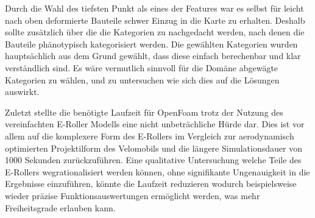 Durch die Wahl des tiefsten Punkt als eines der Features war es selbst für leicht nach oben deformierte Bauteile schwer Einzug in die Karte zu erhalten.
Deshalb sollte zusätzlich über die die Kategorien zu nachgedacht werden, nach denen die Bauteile phänotypisch kategorisiert werden.
Die gewählten Kategorien wurden hauptsächlich aus dem Grund gewählt, dass diese einfach berechenbar und klar verständlich sind.
Es wäre vermutlich sinnvoll für die Domäne abgewägte Kategorien zu wählen, und zu untersuchen wie sich dies auf die Lösungen auswirkt.

Zuletzt stellte die benötigte Laufzeit für OpenFoam trotz der Nutzung des vereinfachten E-Roller Modells eine nicht unbeträchliche Hürde dar.
Dies ist vor allem auf die komplexere Form des E-Rollers im Vergleich zur aerodynamisch optimierten Projektilform des Velomobils und die längere Simulationsdauer von 1000 Sekunden zurückzuführen.
Eine qualitative Untersuchung welche Teile des E-Rollers wegrationalisiert werden können, ohne signifikante Ungenauigkeit in die Ergebnisse einzuführen, könnte die Laufzeit reduzieren wodurch beispielsweise wieder präzise Funktionsauswertungen ermöglicht werden, was mehr Freiheitsgrade erlauben kann.